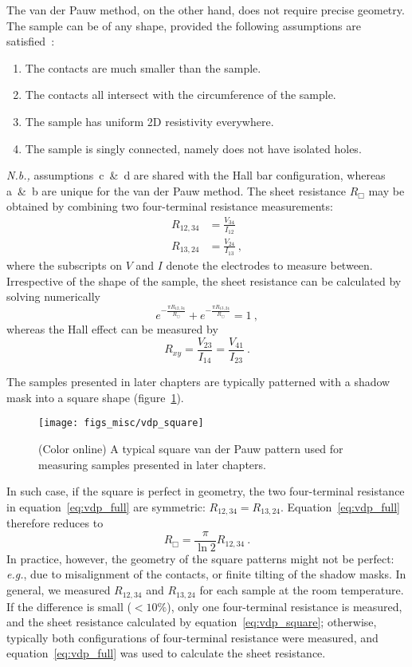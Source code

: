 The van der Pauw method, on the other hand, does not require precise geometry. The sample can be of any shape, provided the following assumptions are satisfied~\cite{VdP1958}:%
\begin{enumerate}[label={\alph*)}]
    \item The contacts are much smaller than the sample.
    \item The contacts all intersect with the circumference of the sample.
    \item The sample has uniform 2D resistivity everywhere.
    \item The sample is singly connected, namely does not have isolated holes.
\end{enumerate}%
\textit{N.b.,} assumptions~c~\&~d are shared with the Hall bar configuration, whereas a~\&~b are unique for the van der Pauw method. The sheet resistance $R_\Box$ may be obtained by combining two four-terminal resistance measurements: %
\begin{align}
    R_{12,34} &= \frac{V_{34}}{I_{12}}\nonumber\\
    R_{13,24} &= \frac{V_{24}}{I_{13}}~,
\end{align}%
where the subscripts on $V$ and $I$ denote the electrodes to measure between. Irrespective of the shape of the sample, the sheet resistance can be calculated by solving numerically%
\begin{equation}\label{eq:vdp_full}
	e^{-\frac{\pi{}R_{12,34}}{R_\Box}} + e^{-\frac{\pi{}R_{13,24}}{R_\Box}} = 1~,
\end{equation}
whereas the Hall effect can be measured by
\begin{equation}\label{eq:vdp_hall}
	R_{xy} = \frac{V_{23}}{I_{14}} = \frac{V_{41}}{I_{23}}~.
\end{equation}

The samples presented in later chapters are typically patterned with a shadow mask into a square shape (figure~\ref{fig:vdp_square}). %
\begin{figure}[ht]%
	\centering%
    \texttt{[image: figs\_misc/vdp\_square]}%
    \caption[A typical square van der Pauw pattern]{\label{fig:vdp_square}(Color online) A typical square van der Pauw pattern used for measuring samples presented in later chapters.}%
\end{figure}%
In such case, if the square is perfect in geometry, the two four-terminal resistance in equation~\ref{eq:vdp_full} are symmetric: $R_{12,34} = R_{13,24}$. Equation~\ref{eq:vdp_full} therefore reduces to%
\begin{equation}\label{eq:vdp_square}
	{R_\Box} = \frac{\pi}{\ln{2}}R_{12,34}~.
\end{equation}%
In practice, however, the geometry of the square patterns might not be perfect: \textit{e.g.}, due to misalignment of the contacts, or finite tilting of the shadow masks. In general, we measured $R_{12,34}$ and $R_{13,24}$ for each sample at the room temperature. If the difference is small ($<10\%$), only one four-terminal resistance is measured, and the sheet resistance calculated by equation~\ref{eq:vdp_square}; otherwise, typically both configurations of four-terminal resistance were measured, and equation~\ref{eq:vdp_full} was used to calculate the sheet resistance.


